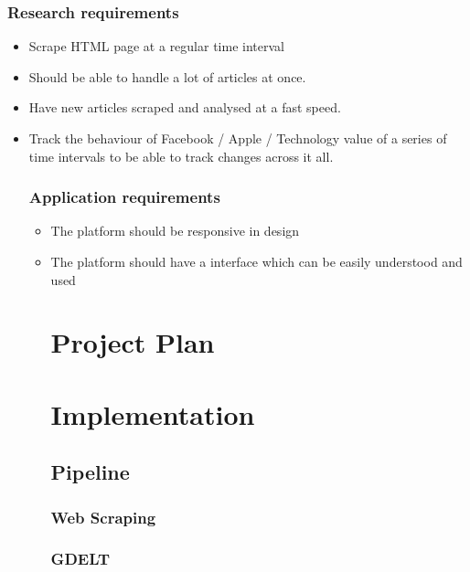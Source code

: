 \documentclass[a4paper,11pt]{report}
\begin{document}
\subsection{Research requirements}
\begin{itemize}
	\item Scrape HTML page at a regular time interval
  \item Should be able to handle a lot of articles at once.
	\item Have new articles scraped and analysed at a fast speed.
	\item Track the behaviour of Facebook / Apple / Technology value of a series of time intervals to be able to track changes across it all.

\subsection{Application requirements}
\begin{itemize}
	\item The platform should be responsive in design
	\item The platform should have a interface which can be easily understood and used
\chapter{Project Plan}
\label{chap:project-plan}

\chapter{Implementation}
\label{chap:implementation}

\section{Pipeline}

\subsection{Web Scraping}

\subsection{GDELT}


\end{itemize}
\end{itemize}
\end{document}
